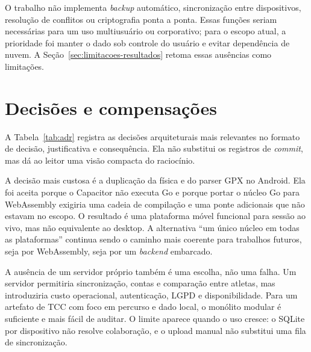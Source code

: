 O trabalho não implementa \textit{backup} automático, sincronização entre
dispositivos, resolução de conflitos ou criptografia ponta a ponta. Essas
funções seriam necessárias para um uso multiusuário ou corporativo; para o
escopo atual, a prioridade foi manter o dado sob controle do usuário e evitar
dependência de nuvem. A Seção~\ref{sec:limitacoes-resultados} retoma essas
ausências como limitações.

\section{Decisões e compensações}
\label{sec:tradeoffs}

A Tabela~\ref{tab:adr} registra as decisões arquiteturais mais relevantes no
formato de decisão, justificativa e consequência. Ela não substitui os
registros de \textit{commit}, mas dá ao leitor uma visão compacta do raciocínio.

A decisão mais custosa é a duplicação da física e do parser GPX no Android.
Ela foi aceita porque o Capacitor não executa Go e porque portar o núcleo Go
para WebAssembly exigiria uma cadeia de compilação e uma ponte adicionais que
não estavam no escopo. O resultado é uma plataforma móvel funcional para sessão
ao vivo, mas não equivalente ao desktop. A alternativa ``um único núcleo em
todas as plataformas'' continua sendo o caminho mais coerente para trabalhos
futuros, seja por WebAssembly, seja por um \textit{backend} embarcado.

A ausência de um servidor próprio também é uma escolha, não uma falha. Um
servidor permitiria sincronização, contas e comparação entre atletas, mas
introduziria custo operacional, autenticação, LGPD e disponibilidade. Para um
artefato de TCC com foco em percurso e dado local, o monólito modular é
suficiente e mais fácil de auditar. O limite aparece quando o uso cresce: o
SQLite por dispositivo não resolve colaboração, e o upload manual não substitui
uma fila de sincronização.


